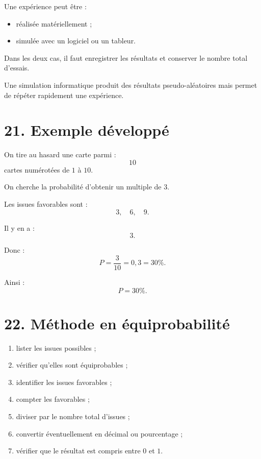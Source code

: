 Une expérience peut être :
\begin{itemize}
\item réalisée matériellement ;
\item simulée avec un logiciel ou un tableur.
\end{itemize}

Dans les deux cas, il faut enregistrer les résultats et conserver le nombre total d'essais.

\begin{remarque}
Une simulation informatique produit des résultats pseudo-aléatoires mais permet de répéter rapidement une expérience.
\end{remarque}

\section{21. Exemple développé}

On tire au hasard une carte parmi :
\[
10
\]
cartes numérotées de $1$ à $10$.

On cherche la probabilité d'obtenir un multiple de $3$.

Les issues favorables sont :
\[
3,\quad6,\quad9.
\]

Il y en a :
\[
3.
\]

Donc :
\[
P=\dfrac3{10}=0{,}3=30\%.
\]

Ainsi :
\[
\boxed{P=30\%}.
\]

\section{22. Méthode en équiprobabilité}

\begin{methode}
\begin{enumerate}
\item lister les issues possibles ;
\item vérifier qu'elles sont équiprobables ;
\item identifier les issues favorables ;
\item compter les favorables ;
\item diviser par le nombre total d'issues ;
\item convertir éventuellement en décimal ou pourcentage ;
\item vérifier que le résultat est compris entre $0$ et $1$.
\end{enumerate}
\end{methode}

